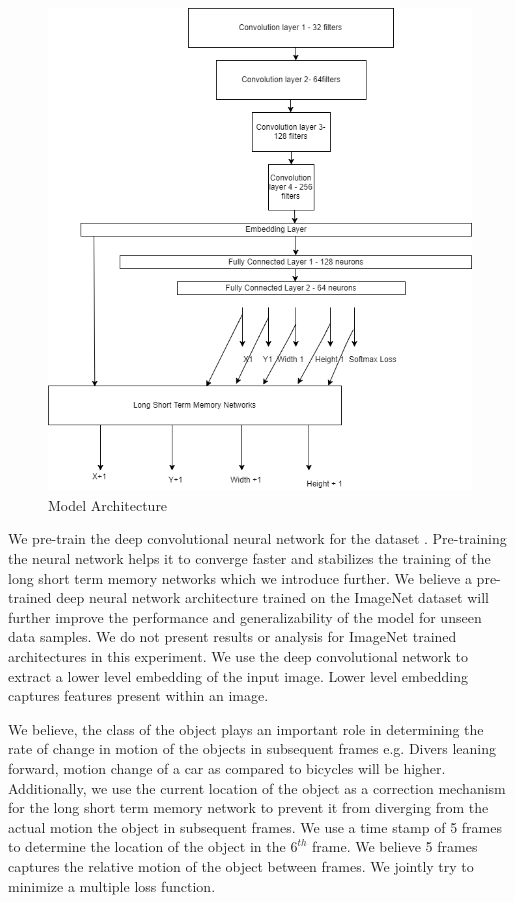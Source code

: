 \documentclass[sigconf]{acmart}
\begin{document}
\begin{figure}  [htbp]
  \includegraphics[width=\linewidth]{images/model.png}
  \caption{Model Architecture}
  \label{Model architecture}
\end{figure}

We pre-train the deep convolutional neural network for the dataset \cite{DBLP:journals/corr/YosinskiCB}. Pre-training the neural network helps it to converge faster and stabilizes the training of the long short term memory networks which we introduce further. We believe a pre-trained deep neural network architecture trained on the ImageNet dataset will further improve the performance and generalizability of the model for unseen data samples. We do not present results or analysis for ImageNet trained architectures in this experiment. We use the deep convolutional network to extract a lower level embedding of the input image. Lower level embedding captures features present within an image. 

We believe, the class of the object plays an important role in determining the rate of change in motion of the objects in subsequent frames {e.g. Divers leaning forward, motion change of a car as compared to bicycles will be higher}. Additionally, we use the current location of the object as a correction mechanism for the long short term memory network to prevent it from diverging from the actual motion the object in subsequent frames. We use a time stamp of 5 frames to determine the location of the object in the $6^{th}$ frame. We believe 5 frames captures the relative motion of the object between frames. We jointly try to minimize a multiple loss function.
\end{document}
